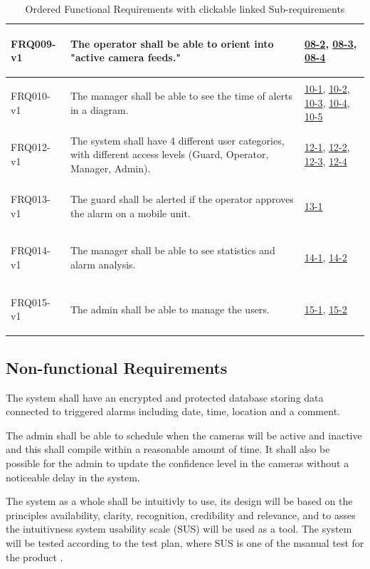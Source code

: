 \documentclass{article}
\begin{document}
\begin{table}[h]
\begin{tabular}{|l|p{8cm}|p{5cm}|}
\hline
\hypertarget{FRQ009}{FRQ009-v1} & The operator shall be able to orient into "active camera feeds." & 
\hyperlink{09-1}{08-2}, \hyperlink{09-2}{08-3}, \hyperlink{09-3}{08-4} \\
\hline
\hypertarget{FRQ010}{FRQ010-v1} & The manager shall be able to see the time of alerts in a diagram. & 
\hyperlink{10-1}{10-1}, \hyperlink{10-2}{10-2}, \hyperlink{10-3}{10-3}, \hyperlink{10-4}{10-4}, \hyperlink{10-5}{10-5} \\
\hline
\hypertarget{FRQ012}{FRQ012-v1} & The system shall have 4 different user categories, with different access levels (Guard, Operator, Manager, Admin). & 
\hyperlink{12-1}{12-1}, \hyperlink{12-2}{12-2}, \hyperlink{12-3}{12-3}, \hyperlink{12-4}{12-4} \\
\hline
\hypertarget{FRQ013}{FRQ013-v1} & The guard shall be alerted if the operator approves the alarm on a mobile unit. & 
\hyperlink{13-1}{13-1} \\
\hline
\hypertarget{FRQ014}{FRQ014-v1} & The manager shall be able to see statistics and alarm analysis. & 
\hyperlink{14-1}{14-1}, \hyperlink{14-2}{14-2} \\
\hline
\hypertarget{FRQ015}{FRQ015-v1} & The admin shall be able to manage the users. & 
\hyperlink{15-1}{15-1}, \hyperlink{15-2}{15-2} \\
\hline
\end{tabular}
\caption{Ordered Functional Requirements with clickable linked Sub-requirements}
\label{table:requirements_ordered}
\end{table}




 






\subsection{Non-functional Requirements}
The system shall have an encrypted and protected database storing data connected to triggered alarms including date, time, location and a comment.  

    The admin shall be able to schedule when the cameras will be active and inactive and this shall compile within a reasonable amount of time.  It shall also be possible for the admin to update the confidence level in the cameras without a noticeable delay in the system.   

The system as a whole shall be intuitivly to use, its design will be based on the principles availability, clarity, recognition, credibility and relevance, and to asses the intuitivness system usability scale (SUS) will be used as a tool. The system will be tested according to the test plan, where SUS is one of the msanual test for the product \cite{usabiltyPrinciples}. 
\end{document}
